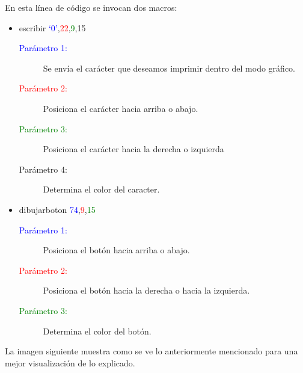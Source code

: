 \documentclass[letterpaper,12 pt,titlepage]{article}
\begin{document}
    En esta línea de código se invocan dos macros:
    \begin{itemize}
        \item escribir \textcolor{blue}{`0'},\textcolor{red}{22},\textcolor{green}{9},15 
        \begin{center}
            \begin{minipage}{0.85\linewidth}
                \begin{description}
                    \item[\textcolor{blue}{Parámetro 1:}] Se envía el carácter que deseamos imprimir dentro del modo gráfico.
                    \item[\textcolor{red}{Parámetro 2:}] Posiciona el carácter hacia arriba o abajo.
                    \item[\textcolor{green}{Parámetro 3:}] Posiciona el carácter hacia la derecha o izquierda
                    \item[Parámetro 4:] Determina el color del caracter.
                \end{description}
            \end{minipage}
        \end{center}

        \item dibujarboton  \textcolor{blue}{74},\textcolor{red}{9},\textcolor{green}{15}
        \begin{center}
            \begin{minipage}{0.85\linewidth}
                \begin{description}
                    \item[\textcolor{blue}{Parámetro 1:}] Posiciona el botón hacia arriba o abajo.
                    \item[\textcolor{red}{Parámetro 2:}] Posiciona el botón hacia la derecha o hacia la izquierda.
                    \item[\textcolor{green}{Parámetro 3:}] Determina el color del botón.
                \end{description}
            \end{minipage}
        \end{center}
    \end{itemize}

    La imagen siguiente muestra como se ve lo anteriormente mencionado para una mejor visualización de lo explicado.
\end{document}
